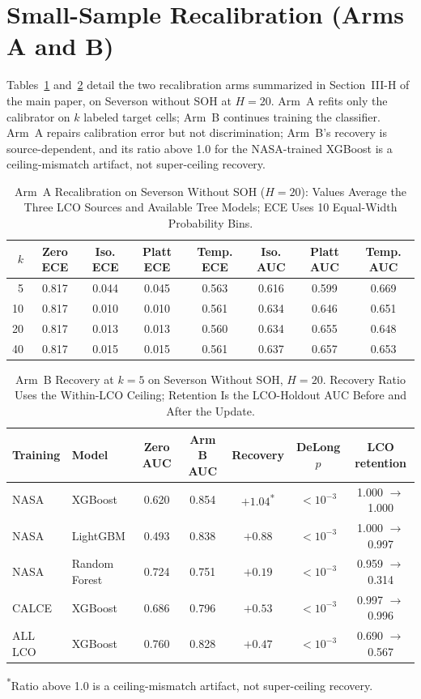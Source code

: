 \documentclass[11pt,a4paper]{article}
\begin{document}
\section{Small-Sample Recalibration (Arms A and B)}
Tables~\ref{tab:s_recA} and~\ref{tab:s_recB} detail the two recalibration arms summarized in Section~III-H of the main paper, on Severson without SOH at $H{=}20$. Arm~A refits only the calibrator on $k$ labeled target cells; Arm~B continues training the classifier. Arm~A repairs calibration error but not discrimination; Arm~B's recovery is source-dependent, and its ratio above 1.0 for the NASA-trained XGBoost is a ceiling-mismatch artifact, not super-ceiling recovery.
\begin{table}[!htbp]
\caption{Arm~A Recalibration on Severson Without SOH ($H{=}20$): Values Average the Three LCO Sources and Available Tree Models; ECE Uses 10 Equal-Width Probability Bins.}
\label{tab:s_recA}
\centering\footnotesize\setlength{\tabcolsep}{4pt}
\begin{tabular}{rccccccc}
\toprule
$k$ & \textbf{Zero ECE} & \textbf{Iso. ECE} & \textbf{Platt ECE} & \textbf{Temp. ECE} & \textbf{Iso. AUC} & \textbf{Platt AUC} & \textbf{Temp. AUC}\\
\midrule
5 & 0.817 & 0.044 & 0.045 & 0.563 & 0.616 & 0.599 & 0.669\\
10 & 0.817 & 0.010 & 0.010 & 0.561 & 0.634 & 0.646 & 0.651\\
20 & 0.817 & 0.013 & 0.013 & 0.560 & 0.634 & 0.655 & 0.648\\
40 & 0.817 & 0.015 & 0.015 & 0.561 & 0.637 & 0.657 & 0.653\\
\bottomrule
\end{tabular}
\end{table}

\begin{table}[!htbp]
\caption{Arm~B Recovery at $k{=}5$ on Severson Without SOH, $H{=}20$. Recovery Ratio Uses the Within-LCO Ceiling; Retention Is the LCO-Holdout AUC Before and After the Update.}
\label{tab:s_recB}
\centering\footnotesize\setlength{\tabcolsep}{3pt}
\begin{tabular}{llccccc}
\toprule
\textbf{Training} & \textbf{Model} & \textbf{Zero AUC} & \textbf{Arm B AUC} & \textbf{Recovery} & \textbf{DeLong $p$} & \textbf{LCO retention}\\
\midrule
NASA & XGBoost & 0.620 & 0.854 & $+1.04$\textsuperscript{*} & $<10^{-3}$ & 1.000 $\rightarrow$ 1.000\\
NASA & LightGBM & 0.493 & 0.838 & $+0.88$ & $<10^{-3}$ & 1.000 $\rightarrow$ 0.997\\
NASA & Random Forest & 0.724 & 0.751 & $+0.19$ & $<10^{-3}$ & 0.959 $\rightarrow$ 0.314\\
CALCE & XGBoost & 0.686 & 0.796 & $+0.53$ & $<10^{-3}$ & 0.997 $\rightarrow$ 0.996\\
ALL LCO & XGBoost & 0.760 & 0.828 & $+0.47$ & $<10^{-3}$ & 0.690 $\rightarrow$ 0.567\\
\bottomrule
\end{tabular}
\footnotesize\textsuperscript{*}Ratio above 1.0 is a ceiling-mismatch artifact, not super-ceiling recovery.
\end{table}
\end{document}
